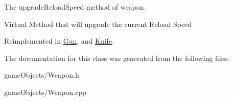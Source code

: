 The upgrade\+Reload\+Speed method of weapon. 

Virtual Method that will upgrade the current Reload Speed 

Reimplemented in \hyperlink{class_gun_a88408d572350474609c2fc294a6b807b}{Gun}, and \hyperlink{class_knife_a270749a27205b0a0994d9dc6d4c93c9c}{Knife}.



The documentation for this class was generated from the following files\+:\begin{DoxyCompactItemize}
\item 
game\+Objects/Weapon.\+h\item 
game\+Objects/Weapon.\+cpp\end{DoxyCompactItemize}
